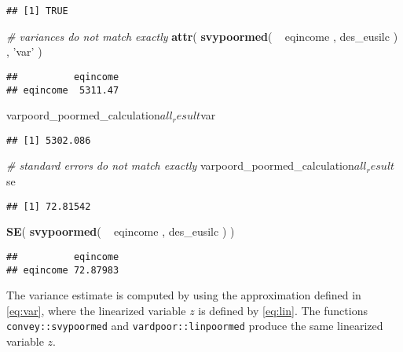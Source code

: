 \documentclass[]{book}
\newenvironment{Shaded}{\begin{snugshade}}{\end{snugshade}}
\newcommand{\KeywordTok}[1]{\textcolor[rgb]{0.13,0.29,0.53}{\textbf{{#1}}}}
\newcommand{\StringTok}[1]{\textcolor[rgb]{0.31,0.60,0.02}{{#1}}}
\newcommand{\CommentTok}[1]{\textcolor[rgb]{0.56,0.35,0.01}{\textit{{#1}}}}
\newcommand{\NormalTok}[1]{{#1}}
\begin{document}
\begin{verbatim}
## [1] TRUE
\end{verbatim}

\begin{Shaded}
\begin{Highlighting}[]
\CommentTok{# variances do not match exactly}
\KeywordTok{attr}\NormalTok{( }\KeywordTok{svypoormed}\NormalTok{( ~}\StringTok{ }\NormalTok{eqincome , des_eusilc ) , }\StringTok{'var'} \NormalTok{)}
\end{Highlighting}
\end{Shaded}

\begin{verbatim}
##          eqincome
## eqincome  5311.47
\end{verbatim}

\begin{Shaded}
\begin{Highlighting}[]
\NormalTok{varpoord_poormed_calculation$all_result$var}
\end{Highlighting}
\end{Shaded}

\begin{verbatim}
## [1] 5302.086
\end{verbatim}

\begin{Shaded}
\begin{Highlighting}[]
\CommentTok{# standard errors do not match exactly}
\NormalTok{varpoord_poormed_calculation$all_result$se}
\end{Highlighting}
\end{Shaded}

\begin{verbatim}
## [1] 72.81542
\end{verbatim}

\begin{Shaded}
\begin{Highlighting}[]
\KeywordTok{SE}\NormalTok{( }\KeywordTok{svypoormed}\NormalTok{( ~}\StringTok{ }\NormalTok{eqincome , des_eusilc ) )}
\end{Highlighting}
\end{Shaded}

\begin{verbatim}
##          eqincome
## eqincome 72.87983
\end{verbatim}

The variance estimate is computed by using the approximation defined in
\eqref{eq:var}, where the linearized variable \(z\) is defined by
\eqref{eq:lin}. The functions \texttt{convey::svypoormed} and
\texttt{vardpoor::linpoormed} produce the same linearized variable
\(z\).
\end{document}
